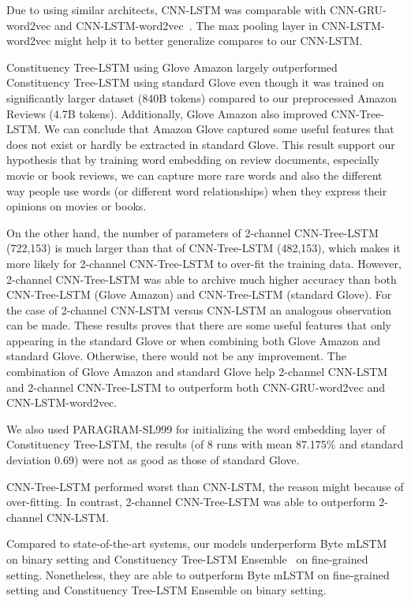 Due to using similar architects, CNN-LSTM was comparable with CNN-GRU-word2vec and CNN-LSTM-word2vec~\cite{cnn-rnn}.
The max pooling layer in CNN-LSTM-word2vec might help it to better generalize compares to our CNN-LSTM.

Constituency Tree-LSTM using Glove Amazon largely outperformed Constituency Tree-LSTM using standard Glove even though it was trained on significantly larger dataset (840B tokens) compared to our preprocessed Amazon Reviews (4.7B tokens).
Additionally, Glove Amazon also improved CNN-Tree-LSTM.
We can conclude that Amazon Glove captured some useful features that does not exist or hardly be extracted in standard Glove.
This result support our hypothesis that by training word embedding on review documents, especially movie or book reviews, we can capture more rare words and also the different way people use words (or different word relationships) when they express their opinions on movies or books.

On the other hand, the number of parameters of 2-channel CNN-Tree-LSTM (722,153) is much larger than that of CNN-Tree-LSTM (482,153), which makes it more likely for 2-channel CNN-Tree-LSTM to over-fit the training data.
However, 2-channel CNN-Tree-LSTM was able to archive much higher accuracy than both CNN-Tree-LSTM (Glove Amazon) and CNN-Tree-LSTM (standard Glove).
For the case of 2-channel CNN-LSTM versus CNN-LSTM an analogous observation can be made.
These results proves that there are some useful features that only appearing in the standard Glove or when combining both Glove Amazon and standard Glove.
Otherwise, there would not be any improvement.
The combination of Glove Amazon and standard Glove help 2-channel CNN-LSTM and 2-channel CNN-Tree-LSTM to outperform both CNN-GRU-word2vec and CNN-LSTM-word2vec.

We also used PARAGRAM-SL999 for initializing the word embedding layer of Constituency Tree-LSTM,
the results (of 8 runs with mean 87.175\% and standard deviation 0.69) were not as good as those of standard Glove.

CNN-Tree-LSTM performed worst than CNN-LSTM, the reason might because of over-fitting.
In contrast, 2-channel CNN-Tree-LSTM was able to outperform 2-channel CNN-LSTM.

Compared to state-of-the-art systems, our models underperform Byte mLSTM~\cite{mlstm} on binary setting and Constituency Tree-LSTM Ensemble~\cite{LooksHHN17} on fine-grained setting.
Nonetheless, they are able to outperform Byte mLSTM on fine-grained setting and Constituency Tree-LSTM Ensemble on binary setting.

